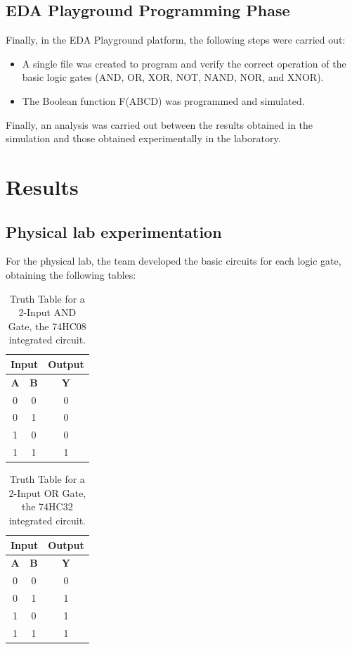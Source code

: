 \documentclass[12pt]{article}  %
\begin{document}
\subsection{EDA Playground Programming Phase}
Finally, in the EDA Playground platform, the following steps were carried
out:
\begin{itemize}
    \item A single file was created to program and verify the correct operation of the basic logic gates (AND, OR, XOR, NOT, NAND, NOR, and XNOR).
    \item The Boolean function F(ABCD) was programmed and simulated.
\end{itemize}

Finally, an analysis was carried out between the results obtained in the simulation and those obtained experimentally in the laboratory.


\section{Results} %
\subsection{Physical lab experimentation}
For the physical lab, the team developed the basic circuits for each logic gate, obtaining the following tables:
\begin{table}[h!]
\centering
\begin{tabular}{|c|c|c|}
\hline
\multicolumn{2}{|c|}{\textbf{Input}} & \textbf{Output} \\
\hline
\textbf{A} & \textbf{B} & \textbf{Y} \\
\hline
0 & 0 & 0 \\
0 & 1 & 0 \\
1 & 0 & 0 \\
1 & 1 & 1 \\
\hline
\end{tabular}
\caption{Truth Table for a 2-Input AND Gate, the 74HC08 integrated circuit.}
\label{tab:and_gate}
\end{table}

\begin{table}[h!]
\centering
\begin{tabular}{|c|c||c|}
\hline
\multicolumn{2}{|c|}{\textbf{Input}} & \textbf{Output} \\
\hline
\textbf{A} & \textbf{B} & \textbf{Y} \\
\hline
0 & 0 & 0 \\
0 & 1 & 1 \\
1 & 0 & 1 \\
1 & 1 & 1 \\
\hline
\end{tabular}
\caption{Truth Table for a 2-Input OR Gate, the 74HC32 integrated circuit.}
\label{tab:or_gate}
\end{table}
\end{document}

